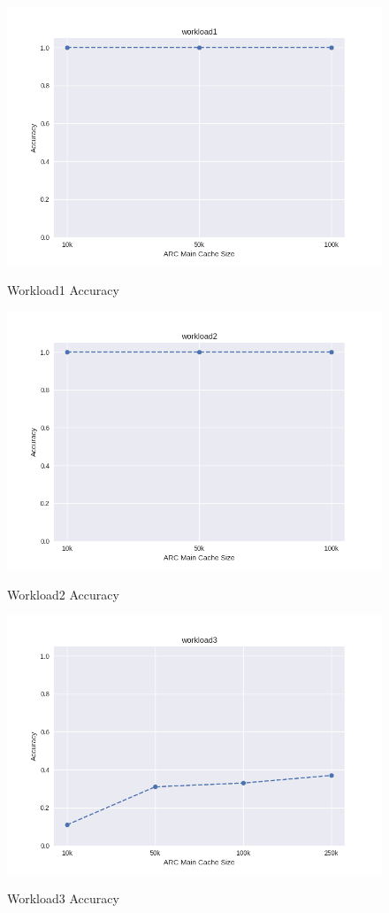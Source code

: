 \documentclass[MEng]{uofl}
\begin{document}
\begin{figure}
    \caption{Workload1 Accuracy}
    \includegraphics[width=\columnwidth]{workload1.png}
    \label{w1}
\end{figure}

\begin{figure}
    \caption{Workload2 Accuracy}
    \includegraphics[width=\columnwidth]{workload2.png}
    \label{w2}
\end{figure}

\begin{figure}
    \caption{Workload3 Accuracy}
    \includegraphics[width=\columnwidth]{workload3.png}
    \label{w3}
\end{figure}
\end{document}
